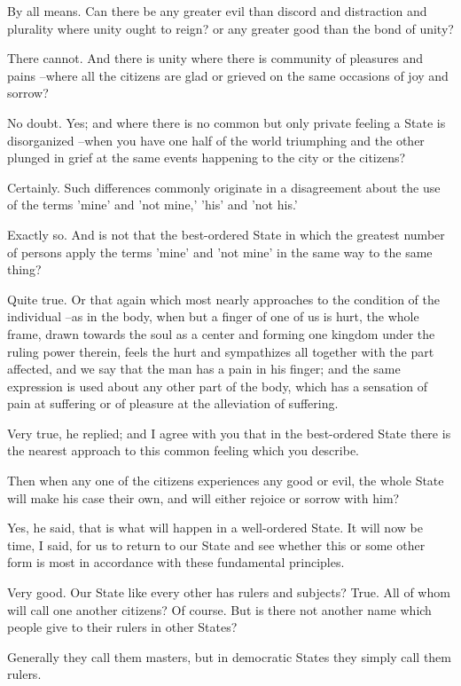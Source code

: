 By all means.
Can there be any greater evil than discord and distraction and plurality where unity ought to reign? or any greater good than the bond of unity?

There cannot.
And there is unity where there is community of pleasures and pains --where all the citizens are glad or grieved on the same occasions of joy and sorrow?

No doubt.
Yes; and where there is no common but only private feeling a State is disorganized --when you have one half of the world triumphing and the other plunged in grief at the same events happening to the city or the citizens?

Certainly.
Such differences commonly originate in a disagreement about the use of the terms 'mine' and 'not mine,' 'his' and 'not his.'

Exactly so.
And is not that the best-ordered State in which the greatest number of persons apply the terms 'mine' and 'not mine' in the same way to the same thing?

Quite true.
Or that again which most nearly approaches to the condition of the individual --as in the body, when but a finger of one of us is hurt, the whole frame, drawn towards the soul as a center and forming one kingdom under the ruling power therein, feels the hurt and sympathizes all together with the part affected, and we say that the man has a pain in his finger; and the same expression is used about any other part of the body, which has a sensation of pain at suffering or of pleasure at the alleviation of suffering.

Very true, he replied; and I agree with you that in the best-ordered State there is the nearest approach to this common feeling which you describe.

Then when any one of the citizens experiences any good or evil, the whole State will make his case their own, and will either rejoice or sorrow with him?

Yes, he said, that is what will happen in a well-ordered State.
It will now be time, I said, for us to return to our State and see whether this or some other form is most in accordance with these fundamental principles.

Very good.
Our State like every other has rulers and subjects?
True.
All of whom will call one another citizens?
Of course.
But is there not another name which people give to their rulers in other States?

Generally they call them masters, but in democratic States they simply call them rulers.

